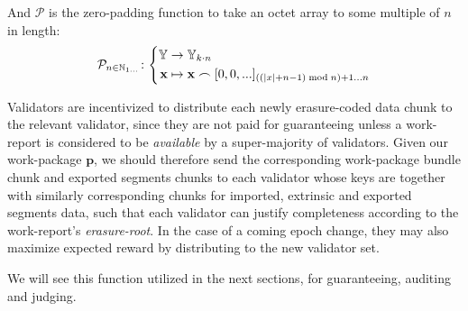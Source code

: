 And $\mathcal{P}$ is the zero-padding function to take an octet array to some multiple of $n$ in length:
\begin{equation}\label{eq:zeropadding}
  \mathcal{P}_{n \in \N_{1\dots}}\colon\left\{\begin{aligned}
    \Y &\to \Y_{k\cdot n}\\
    \mathbf{x} &\mapsto \mathbf{x} \concat [0, 0, ...]_{((|x|+n - 1) \bmod n) + 1 \dots n}
  \end{aligned}\right.
\end{equation}

Validators are incentivized to distribute each newly erasure-coded data chunk to the relevant validator, since they are not paid for guaranteeing unless a work-report is considered to be \emph{available} by a super-majority of validators. Given our work-package $\mathbf{p}$, we should therefore send the corresponding work-package bundle chunk and exported segments chunks to each validator whose keys are together with similarly corresponding chunks for imported, extrinsic and exported segments data, such that each validator can justify completeness according to the work-report's \emph{erasure-root}. In the case of a coming epoch change, they may also maximize expected reward by distributing to the new validator set.

We will see this function utilized in the next sections, for guaranteeing, auditing and judging.

\undef{\newavailabilityspecifier}
\undef{\itemtodigest}
\undef{\countupexports}
\undef{\importsegmentdata}
\undef{\pagedproofs}
\undef{\marshallrefine}
\undef{\extrinsicdata}
\undef{\wpX}
\undef{\wiX}